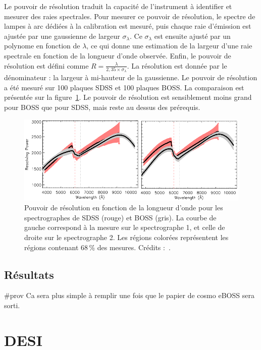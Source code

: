 \documentclass[11pt, twoside, a4paper, openright]{report}
\begin{document}
Le pouvoir de résolution traduit la capacité de l'instrument à identifier et mesurer des raies spectrales. Pour mesurer ce pouvoir de résolution, le spectre de lampes à arc dédiées à la calibration est mesuré, puis chaque raie d'émission est ajustée par une gaussienne de largeur $\sigma_\lambda$. Ce $\sigma_\lambda$ est ensuite ajusté par un polynome en fonction de $\lambda$, ce qui donne une estimation de la largeur d'une raie spectrale en fonction de la longueur d'onde observée. Enfin, le pouvoir de résolution est défini comme $R = \frac{\lambda}{2,35 \times \sigma_\lambda}$. La résolution est donnée par le dénominateur : la largeur à mi-hauteur de la gaussienne. Le pouvoir de résolution a été mesuré sur \num{100} plaques SDSS et \num{100} plaques BOSS. La comparaison est présentée sur la figure~\ref{fig:SpectroResoPower}. Le pouvoir de résolution est sensiblement moins grand pour BOSS que pour SDSS, mais reste au dessus des prérequis.
\begin{figure}
  \centering
  \includegraphics[scale=0.5]{../img/eBOSS/SpectroResoPower}
  \caption{Pouvoir de résolution en fonction de la longueur d'onde pour les spectrographes de SDSS (rouge) et BOSS (gris). La courbe de gauche correspond à la mesure sur le spectrographe 1, et celle de droite sur le spectrographe 2. Les régions colorées représentent les régions contenant 68\,\% des mesures. Crédits :~\cite{Smee2012}.}
  \label{fig:SpectroResoPower}
\end{figure}


\subsection{Résultats}

\#prov Ca sera plus simple à remplir une fois que le papier de cosmo eBOSS sera sorti.

\section{DESI}
\end{document}
